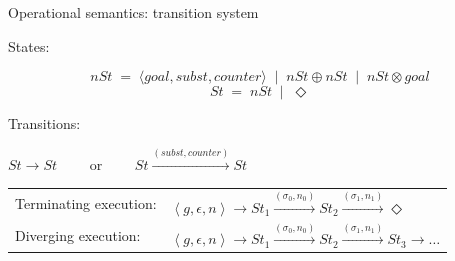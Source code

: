 \documentclass{beamer}
\let\\\tabularnewline
\let\\\tabularnewline
\newcommand{\inbr}[1]{\left<{#1}\right>}
\theoremstyle{definition}
\theoremstyle{plain} %
\begin{document}
\begin{frame}{Operational semantics: transition system}

States:

\[nSt \;=\; \langle goal, subst, counter \rangle \;\;|\;\; nSt \oplus nSt \;\;|\;\; nSt \otimes goal \] 
\[St \;=\; nSt \;\;|\;\; \Diamond\]

\vskip5mm

Transitions:

\begin{center}
$St \xrightarrow{} St \qquad $ or $ \qquad St \xrightarrow{(subst, counter)} St$
\end{center}

\pause

\vskip8mm

\begin{tabular}{ll}
Terminating execution: & $\inbr{g, \epsilon, n} \xrightarrow{} St_1 \xrightarrow{(\sigma_0, n_0)} St_2 \xrightarrow{(\sigma_1, n_1)} \Diamond$ \\
Diverging execution: & $\inbr{g, \epsilon, n} \xrightarrow{} St_1 \xrightarrow{(\sigma_0, n_0)} St_2 \xrightarrow{(\sigma_1, n_1)} St_3 \xrightarrow{} \dots$ \\
\end{tabular}

\end{frame}
\end{document}

